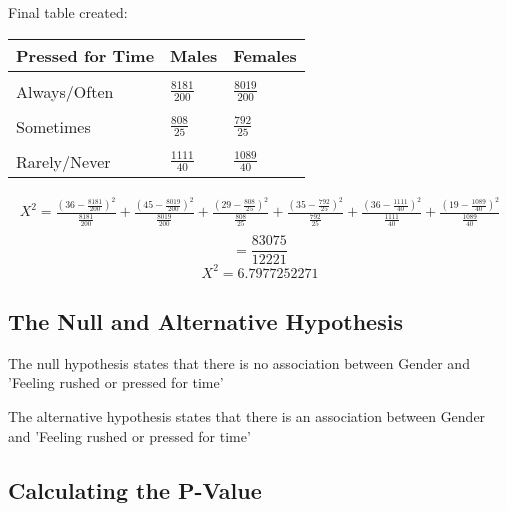 \documentclass[oneside, a4paper]{article}
\begin{document}
\begin{center}
    Final table created:
    \begin{table}[H]
        \centering
        \begin{tabular}{|l|l|l|}
        \hline
        \textbf{Pressed for Time} & \textbf{Males} & \textbf{Females} \\ \hline
        \\[-1em]
        Always/Often              & $\frac{8181}{200}$              & $\frac{8019}{200}$               \\ \hline
        \\[-1em]
        Sometimes                 & $\frac{808}{25}$             & $\frac{792}{25}$               \\ \hline
        \\[-1em]
        Rarely/Never              & $\frac{1111}{40}$             & $\frac{1089}{40}$               \\ \hline
        \end{tabular}
    \end{table}
\end{center}

\begin{equation*}
    \begin{split}
        X^2 = \frac{(36-\frac{8181}{200})^2}{\frac{8181}{200}} + \frac{(45-\frac{8019}{200})^2}{\frac{8019}{200}} + \frac{(29-\frac{808}{25})^2}{\frac{808}{25}} + \frac{(35-\frac{792}{25})^2}{\frac{792}{25}} + \frac{(36-\frac{1111}{40})^2}{\frac{1111}{40}} + \frac{(19-\frac{1089}{40})^2}{\frac{1089}{40}} \\
    \end{split}
\end{equation*}
$$ = \frac{83075}{12221}$$
$$ X^2 = 6.7977252271$$

\subsection{The Null and Alternative Hypothesis}

The null hypothesis states that there is no association between Gender and 'Feeling rushed or pressed for time'

The alternative hypothesis states that there is an association between Gender and 'Feeling rushed or pressed for time'

\subsection{Calculating the P-Value}
\end{document}
